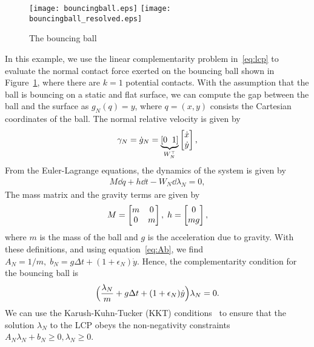 \begin{eg}

  \begin{figure}[tb]
    \centering
    \texttt{[image: bouncingball.eps]}\hfill
    \texttt{[image: bouncingball\_resolved.eps]}
    \caption{The bouncing ball}
    \label{fig:bouncing_ball_sketch}
  \end{figure}
  In this example, we use the linear complementarity problem
  in~\eqref{eq:lcp} to evaluate the normal contact force exerted on the bouncing
  ball shown in Figure~\ref{fig:bouncing_ball_sketch}, where there are $k=1$
  potential contacts. 
  With the assumption that the ball is bouncing on a static and flat surface, we
  can compute the gap between the ball and the surface as $g_N(q) = y$, where $q =
  (x,y)$ consists the Cartesian coordinates of the ball. 
  The normal relative velocity is given by
  \begin{align*}
    \gamma_N = \dot{g}_N = \underbrace{[0 \;\; 1]}_{W_N^\top} \begin{bmatrix}\dot{x} \\ \dot{y}\end{bmatrix},
  \end{align*} 
  From the Euler-Lagrange equations, the dynamics of the system is given by
  \begin{align*}
    M \dd q + h \dd t - W_N \dd \lambda_N  = 0,
  \end{align*}
  The mass matrix and the gravity terms are given by  
  \begin{align*}
    M = \begin{bmatrix}m & 0 \\ 0 & m\end{bmatrix}, \; h = \begin{bmatrix}0 \\ mg\end{bmatrix},
  \end{align*}
  \noindent where $m$ is the mass of the ball and $g$ is the acceleration due to
  gravity.
  With these definitions, and using equation~\eqref{eq:Ab}, we find $ 
    A_N = 1/m, \;
    b_N = g \Delta t + (1+\epsilon_N)\dot{y}$.
  Hence, the complementarity condition for the bouncing ball is
  \begin{align*}
    \Bigl(\frac{\lambda_N}{m} + g \Delta t + (1+\epsilon_N)\dot{y}\Bigr)\lambda_N = 0.
  \end{align*} 
  We can use the Karush-Kuhn-Tucker (KKT) conditions~\cite{hu2012linear} to ensure
  that the solution $\lambda_N$ to the LCP obeys the non-negativity constraints
  $A_N \lambda_N + b_N \geq 0, \lambda_N \geq 0$.
\end{eg}



